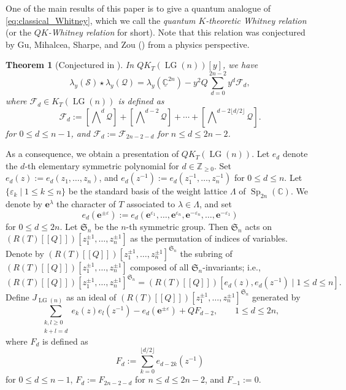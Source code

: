 \documentclass[a4paper, 11pt, reqno]{amsart}
\numberwithin{equation}{section}
\newcommand{\BC}{\mathbb{C}}
\newcommand{\udBC}{\underline{\BC}}
\newcommand{\CF}{\mathcal{F}}
\newcommand{\CQ}{\mathcal{Q}}
\newcommand{\CS}{\mathcal{S}}
\newcommand{\FS}{\mathfrak{S}}
\newcommand{\ve}{\varepsilon}
\newcommand{\e}{\mathbf{e}}
\newcommand{\Sp}[1]{\operatorname{Sp}_{#1}(\BC)}
\newcommand{\LG}{\operatorname{LG}}
\newcommand{\bra}[1]{[\![ #1 ]\!]}
\newcommand{\class}[1]{\left[ #1 \right]}
\newcommand{\extprod}{\bigwedge\nolimits}
\theoremstyle{plain}
\newtheorem{thm}{Theorem}[section]
\theoremstyle{definition}
\theoremstyle{remark}
\begin{document}
One of the main results of this paper is to give a quantum analogue of \eqref{eq:classical_Whitney}, which we call the \emph{quantum $K$-theoretic Whitney relation} (or the \emph{$QK$-Whitney relation} for short).
Note that this relation was conjectured by Gu, Mihalcea, Sharpe, and Zou (\cite{GMSZ}) from a physics perspective. 
\begin{thm}[{Conjectured in \cite[(6.95)]{GMSZ}}] \label{thm:Whitney_rel}
In $QK_{T}(\LG(n))[y]$, we have 
\begin{equation} \label{eq:QK-Whitney_rel}
\lambda_{y}(\CS) \star \lambda_{y}(\CQ) = \lambda_{y}(\udBC^{2n}) - y^{2} Q \sum_{d=0}^{2n-2} y^{d} \CF_{d}, 
\end{equation}
where $\CF_{d} \in K_{T}(\LG(n))$ is defined as 
\begin{equation}
\CF_{d} := \class{\extprod^{d} \CQ} + \class{\extprod^{d-2} \CQ} + \cdots + \class{\extprod^{d - 2\lfloor d/2 \rfloor} \CQ}. 
\end{equation}
for $0 \le d \le n-1$, and $\CF_{d} := \CF_{2n-2-d}$ for $n \le d \le 2n-2$. 
\end{thm}

As a consequence, we obtain a presentation of $QK_{T}(\LG(n))$. 
Let $e_{d}$ denote the $d$-th elementary symmetric polynomial for $d \in \mathbb{Z}_{\ge 0}$. 
Set $e_{d}(z) := e_{d}(z_{1}, \ldots, z_{n})$, and $e_{d}(z^{-1}) := e_{d}(z_{1}^{-1}, \ldots, z_{n}^{-1})$ for $0 \le d \le n$. 
Let $\{\ve_{k} \mid 1 \le k \le n\}$ be the standard basis of the weight lattice $\Lambda$ of $\Sp{2n}$. 
We denote by $\e^{\lambda}$ the character of $T$ associated to $\lambda \in \Lambda$, and set 
\begin{equation}
e_{d}(\e^{\pm \ve}) := e_{d}(\e^{\ve_{1}}, \ldots, \e^{\ve_{n}}, \e^{-\ve_{n}}, \ldots, \e^{-\ve_{1}})
\end{equation}
for $0 \le d \le 2n$. 
Let $\FS_{n}$ be the $n$-th symmetric group. Then $\FS_{n}$ acts on $(R(T)\bra{Q})[z_{1}^{\pm 1}, \ldots, z_{n}^{\pm 1}]$ as the permutation of indices of variables. 
Denote by $(R(T)\bra{Q})[z_{1}^{\pm 1}, \ldots, z_{n}^{\pm 1}]^{\FS_{n}}$ the subring of $(R(T)\bra{Q})[z_{1}^{\pm 1}, \ldots, z_{n}^{\pm 1}]$ composed of all $\FS_{n}$-invariants; i.e., 
\begin{equation}
(R(T)\bra{Q})[z_{1}^{\pm 1}, \ldots, z_{n}^{\pm 1}]^{\FS_{n}} = (R(T)\bra{Q})[e_{d}(z), e_{d}(z^{-1}) \mid 1 \le d \le n]. 
\end{equation} 
Define $J_{\LG(n)}$ as an ideal of $(R(T)\bra{Q})[z_{1}^{\pm 1}, \ldots, z_{n}^{\pm 1}]^{\mathfrak{S}_{n}}$ generated by 
\begin{equation}
\sum_{\substack{k, l \ge 0 \\ k+l=d}} e_{k}(z) e_{l}(z^{-1}) - e_{d}(\e^{\pm \ve}) + QF_{d-2}, \qquad 1 \le d \le 2n, 
\end{equation}
where $F_{d}$ is defined as 
\begin{equation}
F_{d} := \sum_{k=0}^{\lfloor d/2 \rfloor} e_{d-2k}(z^{-1})
\end{equation}
for $0 \le d \le n-1$, $F_{d} := F_{2n-2-d}$ for $n \le d \le 2n-2$, and $F_{-1} := 0$. 
\end{document}
